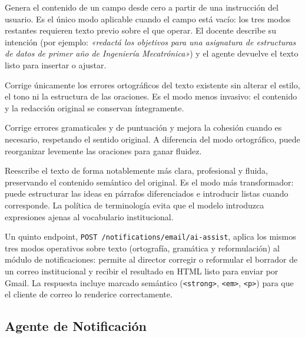 \begin{description}[noitemsep, leftmargin=1.6cm, labelwidth=1.4cm]
  \item[Generación (\texttt{/ai-generate})]
    Genera el contenido de un campo desde cero a partir de una instrucción
    del usuario.
    Es el único modo aplicable cuando el campo está vacío: los tres modos
    restantes requieren texto previo sobre el que operar.
    El docente describe su intención (por ejemplo:
    \textit{«redactá los objetivos para una asignatura de estructuras de
    datos de primer año de Ingeniería Mecatrónica»}) y el agente devuelve
    el texto listo para insertar o ajustar.

  \item[Corrección ortográfica]
    Corrige únicamente los errores ortográficos del texto existente sin
    alterar el estilo, el tono ni la estructura de las oraciones.
    Es el modo menos invasivo: el contenido y la redacción original se
    conservan íntegramente.

  \item[Corrección gramatical]
    Corrige errores gramaticales y de puntuación y mejora la cohesión
    cuando es necesario, respetando el sentido original.
    A diferencia del modo ortográfico, puede reorganizar levemente las
    oraciones para ganar fluidez.

  \item[Reformulación (\texttt{/ai-reformulate})]
    Reescribe el texto de forma notablemente más clara, profesional y
    fluida, preservando el contenido semántico del original.
    Es el modo más transformador: puede estructurar las ideas en párrafos
    diferenciados e introducir listas cuando corresponde.
    La política de terminología evita que el modelo introduzca expresiones
    ajenas al vocabulario institucional.
\end{description}

Un quinto endpoint, \texttt{POST /notifications/email/ai-assist}, aplica
los mismos tres modos operativos sobre texto (ortografía, gramática y
reformulación) al módulo de notificaciones: permite al director corregir
o reformular el borrador de un correo institucional y recibir el resultado
en HTML listo para enviar por Gmail.
La respuesta incluye marcado semántico (\texttt{<strong>}, \texttt{<em>},
\texttt{<p>}) para que el cliente de correo lo renderice correctamente.

\subsection{Agente de Notificación}
\label{subsec:agente_notificacion}

